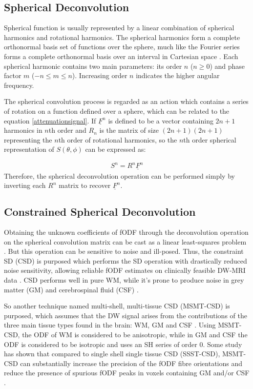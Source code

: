 \subsection{Spherical Deconvolution}
Spherical function is usually represented by a linear combination of spherical harmonics and rotational harmonics. 
The spherical harmonics form a complete orthonormal basis set of functions over the sphere, 
much like the Fourier series forms a complete orthonormal basis over an interval in Cartesian space \cite{tournierDirectEstimationFiber2004}.
Each spherical harmonic contains two main parameters: its order $n$ ($n \geq  0$) and phase factor $m$ ($ -n \leq m \leq n$). 
Increasing order $n$ indicates the higher angular frequency. 

The spherical convolution process is regarded as an action which contains a series of rotation on a function defined over a sphere, which can be related
to the equation \ref{attenuationsignal}. If $\underline{F}^{n}$ is defined to be a vector containing $2n+1$ harmonics in $n$th order 
and $R_{n}$ is the matrix of size $(2n+1)(2n+1)$ representing the $n$th order of rotational harmonics, 
so the $n$th order spherical representation of $S(\theta, \phi)$ can be expressed as:

\begin{gather}\label{sc}  
    S^{n} = R^{n} \underline{F}^{n}
\end{gather}
Therefore, the spherical deconvolution operation can be performed simply by inverting each $R^{n}$ matrix to recover $\underline{F}^{n}$. 

\subsection{Constrained Spherical Deconvolution}
Obtaining the unknown coefficients of fODF through the deconvolution operation on the spherical convolution matrix can be cast as a linear least-squares problem \cite{jeurissenMultitissueConstrainedSpherical2014}.
But this operation can be sensitive to noise and ill-posed. Thus, the constraint SD (CSD) is purposed which performs the SD operation with drastically reduced noise sensitivity, 
allowing reliable fODF estimates on clinically feasible DW-MRI data \cite{tournierRobustDeterminationFibre2007}. CSD performs well in pure WM, while it's prone to produce 
noise in grey matter (GM) and cerebrospinal fluid (CSF) \cite{jeurissenMultitissueConstrainedSpherical2014}. 

So another technique named multi-shell, multi-tissue CSD (MSMT-CSD) is purposed, which assumes that the DW signal arises from the contributions of the three main tissue types found in the brain: WM, GM and CSF \cite{jeurissenMultitissueConstrainedSpherical2014}.
Using MSMT-CSD, the ODF of WM is considered to be anisotropic, while in GM and CSF the ODF is considered to be isotropic and uses an SH series of order 0. 
Some study has shown that compared to single shell single tissue CSD (SSST-CSD), MSMT-CSD can substantially increase the precision of the fODF fibre orientations 
and reduce the presence of spurious fODF peaks in voxels containing GM and/or CSF \cite{jeurissenMultitissueConstrainedSpherical2014}.

